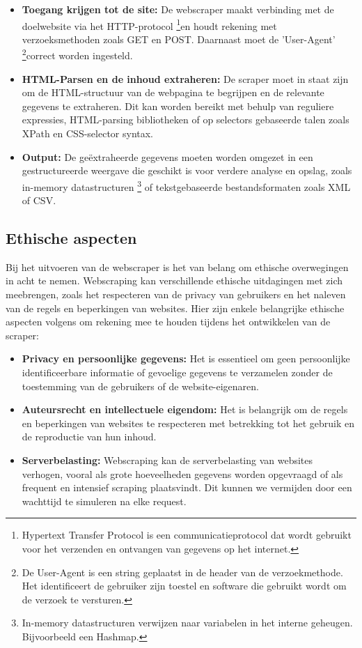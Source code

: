 \begin{itemize}
    \item \textbf{Toegang krijgen tot de site:} De webscraper maakt verbinding met de doelwebsite via het HTTP-protocol \footnote{Hypertext Transfer Protocol is een communicatieprotocol dat wordt gebruikt voor het verzenden en ontvangen van gegevens op het internet.}en houdt rekening met verzoeksmethoden zoals GET en POST. Daarnaast moet de 'User-Agent' \footnote{De User-Agent is een string geplaatst in de header van de verzoekmethode. Het identificeert de gebruiker zijn toestel en software die gebruikt wordt om de verzoek te versturen.}correct worden ingesteld.
    \item \textbf{HTML-Parsen en de inhoud extraheren:} De scraper moet in staat zijn om de HTML-structuur van de webpagina te begrijpen en de relevante gegevens te extraheren. Dit kan worden bereikt met behulp van reguliere expressies, HTML-parsing bibliotheken of op selectors gebaseerde talen zoals XPath en CSS-selector syntax.
    \item \textbf{Output:} De geëxtraheerde gegevens moeten worden omgezet in een gestructureerde weergave die geschikt is voor verdere analyse en opslag, zoals in-memory datastructuren \footnote{In-memory datastructuren verwijzen naar variabelen in het interne geheugen. Bijvoorbeeld een Hashmap.} of tekstgebaseerde bestandsformaten zoals XML of CSV.
\end{itemize}

\subsection{Ethische aspecten}
\label{subsection:scraper-ethische-aspecten}
Bij het uitvoeren van de webscraper is het van belang om ethische overwegingen in acht te nemen. Webscraping kan verschillende ethische uitdagingen met zich meebrengen, zoals het respecteren van de privacy van gebruikers en het naleven van de regels en beperkingen van websites. Hier zijn enkele belangrijke ethische aspecten volgens \autocite{scrape_ethics} om rekening mee te houden tijdens het ontwikkelen van de scraper: 

\begin{itemize}
    \item \textbf{Privacy en persoonlijke gegevens:} Het is essentieel om geen persoonlijke identificeerbare informatie of gevoelige gegevens te verzamelen zonder de toestemming van de gebruikers of de website-eigenaren.
    \item \textbf{Auteursrecht en intellectuele eigendom:} Het is belangrijk om de regels en beperkingen van websites te respecteren met betrekking tot het gebruik en de reproductie van hun inhoud.
    \item \textbf{Serverbelasting:} Webscraping kan de serverbelasting van websites verhogen, vooral als grote hoeveelheden gegevens worden opgevraagd of als frequent en intensief scraping plaatsvindt. Dit kunnen we vermijden door een wachttijd te simuleren na elke request. 
\end{itemize}

